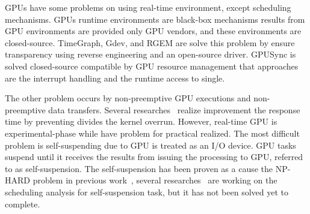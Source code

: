 GPUs have some problems on using real-time environment, except  scheduling mechanisms.
GPUs runtime environments are black-box mechanisms results from GPU environments are provided only GPU vendors, and these environments are closed-source.
TimeGraph, Gdev, and RGEM are solve this problem by ensure transparency using reverse engineering and an open-source driver.
GPUSync is solved closed-source compatible by GPU resource management that approaches are the interrupt handling and the runtime access to single.

The other problem occurs by non-preemptive GPU executions and non-preemptive data transfers.
Several researches~\cite{basaran:preemptive,sparc} realize improvement  the response time by preventing divides the kernel overrun.
However, real-time GPU is experimental-phase while have problem for practical realized.
The most difficult problem is self-suspending due to GPU is treated as an I/O device.
GPU tasks suspend until it receives the results from issuing the processing to GPU, referred to as self-suspension.
The self-suspension has been proven as a cause the NP-HARD problem in previous work~\cite{self-sus:1,self-sus:2},
several researches~\cite{chattopadhyay2014limited,kim2013segment} are working on the scheduling analysis for self-suspension task, but it has not been solved yet to complete.

